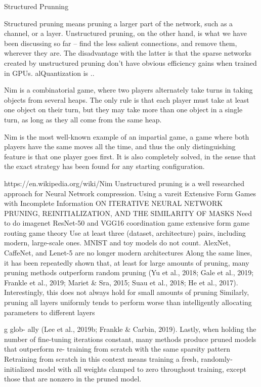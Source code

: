 \documentclass{article}
\begin{document}
Structured Prunning

Structured pruning means pruning a larger part of the network, such as a channel, or a layer. Unstructured pruning, on the other hand, is what we have been discussing so far – find the less salient connections, and remove them, wherever they are. The disadvantage with the latter is that the sparse networks created by unstructured pruning don’t have obvious efficiency gains when trained in GPUs.
alQuantization is ..

Nim is a combinatorial game, where two players alternately take turns in taking objects from several heaps. The only rule is that each player must take at least one object on their turn, but they may take more than one object in a single turn, as long as they all come from the same heap.

Nim is the most well-known example of an impartial game, a game where both players have the same moves all the time, and thus the only distinguishing feature is that one player goes first. It is also completely solved, in the sense that the exact strategy has been found for any starting configuration.





https://en.wikipedia.org/wiki/Nim
Unstructured pruning is a well researched approach for Neural Network compression. Using a vareit
Extensive Form
Games with
Incomplete
Information
ON ITERATIVE NEURAL NETWORK PRUNING, REINITIALIZATION, AND THE SIMILARITY OF MASKS
Need to do imagenet ResNet-50 and VGG16
    coordination game extensive form game routing game theory
Use at least three (dataset, architecture) pairs, including modern, large-scale ones. MNIST and toy models do not count. AlexNet, CaffeNet, and Lenet-5 are no longer modern architectures
Along the same lines, it has been repeatedly shown that, at least for large amounts of pruning, many pruning methods outperform random pruning (Yu et al., 2018; Gale et al., 2019; Frankle et al., 2019; Mariet & Sra, 2015; Suau et al., 2018; He et al., 2017). Interestingly, this does not always hold for small amounts of pruning
Similarly, pruning all layers uniformly tends to perform worse than intelligently allocating parameters to different layers

g glob- ally (Lee et al., 2019b; Frankle & Carbin, 2019). Lastly, when holding the number of fine-tuning iterations constant, many methods produce pruned models that outperform re- training from scratch with the same sparsity pattern
Retraining from scratch in this context means training a fresh, randomly-initialized model with all weights clamped to zero throughout training, except those that are nonzero in the pruned model.
\end{document}
